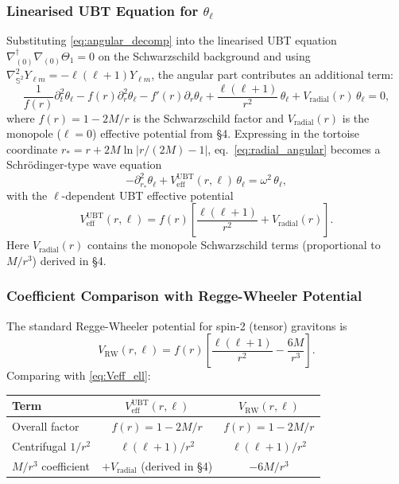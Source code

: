 \documentclass[12pt]{article}
\theoremstyle{definition}
\theoremstyle{remark}
\begin{document}
\subsubsection{Linearised UBT Equation for $\theta_\ell$}

Substituting \eqref{eq:angular_decomp} into the linearised UBT equation
$\nabla^\dagger_{(0)}\nabla_{(0)}\Theta_1 = 0$ on the Schwarzschild background
and using $\nabla^2_{\mathbb{S}^2} Y_{\ell m} = -\ell(\ell+1)Y_{\ell m}$, the
angular part contributes an additional term:
\begin{equation}
  \label{eq:radial_angular}
  \frac{1}{f(r)}\partial_t^2\theta_\ell
  - f(r)\partial_r^2\theta_\ell
  - f'(r)\partial_r\theta_\ell
  + \frac{\ell(\ell+1)}{r^2}\,\theta_\ell
  + V_{\text{radial}}(r)\,\theta_\ell = 0,
\end{equation}
where $f(r) = 1 - 2M/r$ is the Schwarzschild factor and
$V_{\text{radial}}(r)$ is the monopole ($\ell=0$) effective potential
from \S4.  Expressing in the tortoise coordinate
$r_* = r + 2M\ln|r/(2M)-1|$, eq.~\eqref{eq:radial_angular} becomes
a Schr\"odinger-type wave equation
\begin{equation}
  \label{eq:schrodinger_ell}
  -\partial_{r_*}^2\theta_\ell + V_{\text{eff}}^{\text{UBT}}(r,\ell)\,\theta_\ell
  = \omega^2\,\theta_\ell,
\end{equation}
with the $\ell$-dependent UBT effective potential
\begin{equation}
  \label{eq:Veff_ell}
  \boxed{V_{\text{eff}}^{\text{UBT}}(r,\ell)
    = f(r)\left[\frac{\ell(\ell+1)}{r^2} + V_{\text{radial}}(r)\right].}
\end{equation}
Here $V_{\text{radial}}(r)$ contains the monopole Schwarzschild terms
(proportional to $M/r^3$) derived in \S4.

\subsubsection{Coefficient Comparison with Regge-Wheeler Potential}

The standard Regge-Wheeler potential for spin-2 (tensor) gravitons is
\begin{equation}
  \label{eq:VRW}
  V_{\text{RW}}(r, \ell) = f(r)\left[\frac{\ell(\ell+1)}{r^2} - \frac{6M}{r^3}\right].
\end{equation}
Comparing with \eqref{eq:Veff_ell}:

\begin{center}
\begin{tabular}{|l|c|c|}
\hline
\textbf{Term} & $V_{\text{eff}}^{\text{UBT}}(r,\ell)$ & $V_{\text{RW}}(r,\ell)$ \\
\hline
Overall factor & $f(r) = 1-2M/r$ & $f(r) = 1-2M/r$ \\
Centrifugal $1/r^2$ & $\ell(\ell+1)/r^2$ & $\ell(\ell+1)/r^2$ \\
$M/r^3$ coefficient & $+V_{\text{radial}}$ (derived in §4) & $-6M/r^3$ \\
\hline
\end{tabular}
\end{center}
\end{document}
